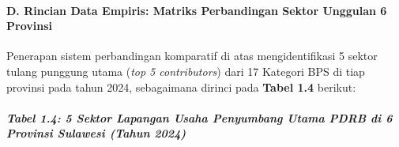 \documentclass[
]{article}
\begin{document}
\paragraph{D. Rincian Data Empiris: Matriks Perbandingan Sektor Unggulan
6
Provinsi}\label{d.-rincian-data-empiris-matriks-perbandingan-sektor-unggulan-6-provinsi}

Penerapan sistem perbandingan komparatif di atas mengidentifikasi 5
sektor tulang punggung utama (\emph{top 5 contributors}) dari 17
Kategori BPS di tiap provinsi pada tahun 2024, sebagaimana dirinci pada
\textbf{Tabel 1.4} berikut:

\subparagraph{Tabel 1.4: 5 Sektor Lapangan Usaha Penyumbang Utama PDRB
di 6 Provinsi Sulawesi (Tahun
2024)}\label{tabel-1.4-5-sektor-lapangan-usaha-penyumbang-utama-pdrb-di-6-provinsi-sulawesi-tahun-2024}
\end{document}
